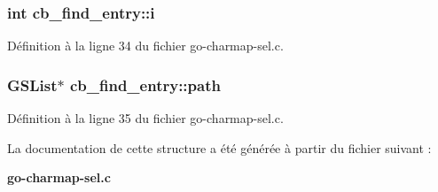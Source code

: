 \subsubsection[{i}]{\setlength{\rightskip}{0pt plus 5cm}int {\bf cb\_\-find\_\-entry::i}}\label{structcb__find__entry_a13d741e057687aa2571f57f2e4a9e8ee}


Définition à la ligne 34 du fichier go-\/charmap-\/sel.c.

\subsubsection[{path}]{\setlength{\rightskip}{0pt plus 5cm}GSList$\ast$ {\bf cb\_\-find\_\-entry::path}}\label{structcb__find__entry_a439266ccf79e1b44ef78cf2de0211c56}


Définition à la ligne 35 du fichier go-\/charmap-\/sel.c.



La documentation de cette structure a été générée à partir du fichier suivant :\begin{DoxyCompactItemize}
\item 
{\bf go-\/charmap-\/sel.c}\end{DoxyCompactItemize}
